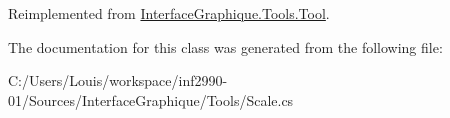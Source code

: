 Reimplemented from \hyperlink{class_interface_graphique_1_1_tools_1_1_tool_aedd1c93f96ee602475b7cbc3c9c99baa}{Interface\+Graphique.\+Tools.\+Tool}.



The documentation for this class was generated from the following file\+:\begin{DoxyCompactItemize}
\item 
C\+:/\+Users/\+Louis/workspace/inf2990-\/01/\+Sources/\+Interface\+Graphique/\+Tools/Scale.\+cs\end{DoxyCompactItemize}
